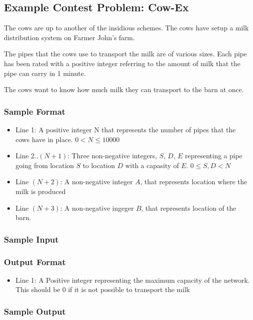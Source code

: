 \subsection{Example Contest Problem: Cow-Ex}
The cows are up to another of the insidious schemes.
The cows have setup a milk distribution system on Farmer John's farm.

The pipes that the cows use to transport the milk are of various sizes.
Each pipe has been rated with a positive integer referring to the amount of milk that the pipe can carry in 1 minute.

The cows want to know how much milk they can transport to the barn at once.
\subsubsection{Sample Format}
\begin{itemize}
	\item Line 1: A positive integer N that represents the number of pipes that the cows have in place. $0 < N \leq 10000$
	\item Line 2..$(N+1)$: Three non-negative integers, $S$, $D$, $E$ representing a pipe going from location $S$ to location $D$ with a capasity of $E$. $0 \leq S,D < N$
	\item Line $(N+2)$: A non-negative integer $A$, that represents location where the milk is produced
	\item Line $(N+3)$: A non-negative ingeger $B$, that represents location of the barn.
\end{itemize}

\subsubsection{Sample Input}

\subsubsection{Output Format}
\begin{itemize}
	\item Line 1: A Positive integer representing the maximum capacity of the network.
				  This should be 0 if it is not possible to transport the milk
\end{itemize}
\subsubsection{Sample Output}
